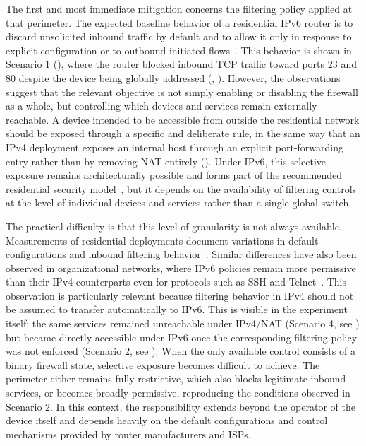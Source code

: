 The first and most immediate mitigation concerns the filtering policy applied at that perimeter. The expected baseline behavior of a residential IPv6 router is to discard unsolicited inbound traffic by default and to allow it only in response to explicit configuration or to outbound-initiated flows~\cite{rfc6092}. This behavior is shown in Scenario 1 (), where the router blocked inbound TCP traffic toward ports 23 and 80 despite the device being globally addressed (, ). However, the observations suggest that the relevant objective is not simply enabling or disabling the firewall as a whole, but controlling which devices and services remain externally reachable. A device intended to be accessible from outside the residential network should be exposed through a specific and deliberate rule, in the same way that an IPv4 deployment exposes an internal host through an explicit port-forwarding entry rather than by removing NAT entirely (). Under IPv6, this selective exposure remains architecturally possible and forms part of the recommended residential security model~\cite{rfc6092}, but it depends on the availability of filtering controls at the level of individual devices and services rather than a single global switch. 

The practical difficulty is that this level of granularity is not always available. Measurements of residential deployments document variations in default configurations and inbound filtering behavior~\cite{rye2025firewalls}. Similar differences have also been observed in organizational networks, where IPv6 policies remain more permissive than their IPv4 counterparts even for protocols such as SSH and Telnet~\cite{czyz2016backdoor}. This observation is particularly relevant because filtering behavior in IPv4 should not be assumed to transfer automatically to IPv6. This is visible in the experiment itself: the same services remained unreachable under IPv4/NAT (Scenario 4, see ) but became directly accessible under IPv6 once the corresponding filtering policy was not enforced (Scenario 2, see ). When the only available control consists of a binary firewall state, selective exposure becomes difficult to achieve. The perimeter either remains fully restrictive, which also blocks legitimate inbound services, or becomes broadly permissive, reproducing the conditions observed in Scenario 2. In this context, the responsibility extends beyond the operator of the device itself and depends heavily on the default configurations and control mechanisms provided by router manufacturers and ISPs.

